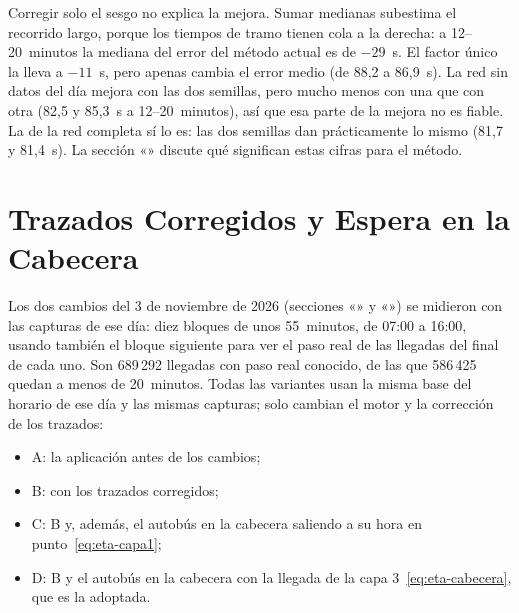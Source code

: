 Corregir solo el sesgo no explica la mejora. Sumar medianas subestima el recorrido largo, porque los tiempos de tramo
tienen cola a la derecha: a 12--20~minutos la mediana del error del método actual es de $-29$~s. El factor único la
lleva a $-11$~s, pero apenas cambia el error medio (de 88,2 a 86,9~s). La red sin datos del día mejora con las dos
semillas, pero mucho menos con una que con otra (82,5 y 85,3~s a 12--20~minutos), así que esa parte de la mejora no es
fiable. La de la red completa sí lo es: las dos semillas dan prácticamente lo mismo (81,7 y 81,4~s). La
sección «» discute qué significan estas cifras para el método.

\section{Trazados Corregidos y Espera en la Cabecera}
\label{sec:eval-trazados}

Los dos cambios del 3 de noviembre de 2026 (secciones «» y «») se
midieron con las capturas de ese día: diez bloques de unos 55~minutos, de 07:00 a 16:00, usando también el bloque
siguiente para ver el paso real de las llegadas del final de cada uno. Son 689\,292 llegadas con paso real conocido,
de las que 586\,425 quedan a menos de 20~minutos. Todas las variantes usan la misma base del horario de ese día y las mismas capturas; solo cambian el motor y la corrección de los
trazados:

\begin{itemize}
  \item A: la aplicación antes de los cambios;
  \item B: con los trazados corregidos;
  \item C: B y, además, el autobús en la cabecera saliendo a su hora en punto~\eqref{eq:eta-capa1};
  \item D: B y el autobús en la cabecera con la llegada de la capa 3~\eqref{eq:eta-cabecera}, que es la adoptada.
\end{itemize}

